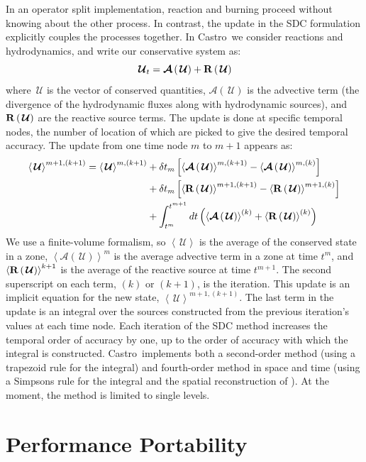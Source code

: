 \documentclass[a4paper]{jpconf}
\newcommand{\castro}{{\sffamily Castro}}
\newcommand{\Uc}{{\,\bm{\mathcal{U}}}}
\newcommand{\Advs}[1]{\boldsymbol{\mathcal{A}} \left(#1\right)}
\newcommand{\avg}[1]{{\left \langle #1 \right \rangle}}
\newcommand{\Rbs}[1]{{\bf R} \left ( #1 \right )}
\begin{document}
In an operator split implementation, reaction and burning proceed
without knowing about the other process.  In contrast, the update in
the SDC formulation explicitly couples the processes together.  In \castro\ we consider
reactions and hydrodynamics, and write our conservative system as:
\begin{equation}
\Uc_t = \Advs{\Uc} + \Rbs{\Uc}
\end{equation}
where $\Uc$ is the vector of conserved quantities, $\Advs{\Uc}$ is the
advective term (the divergence of the hydrodynamic fluxes along with
hydrodynamic sources), and $\Rbs{\Uc}$ are the reactive source terms.
The update is done at specific temporal nodes, the number of location
of which are picked to give the desired temporal accuracy.  The update
from one time node $m$ to $m+1$ appears as:
    \begin{align}
      \label{eq:sdc:general}
      \avg{\Uc}^{{m+1},(k+1)} = \avg{\Uc}^{m,(k+1)}
            &+ \delta t_m \left [ \avg{\Advs{\Uc}}^{m,(k+1)} - \avg{\Advs{\Uc}}^{m,(k)} \right ] \nonumber \\
            &+ \delta t_m \left [ \avg{\Rbs{\Uc}}^{{m+1},(k+1)} - \avg{\Rbs{\Uc}}^{{m+1},(k)} \right ] \nonumber \\
            &+ \int_{t^m}^{t^{m+1}} dt  \left (\avg{\Advs{\Uc}}^{(k)} + \avg{\Rbs{\Uc}}^{(k)}\right)
   \end{align}
We use a finite-volume formalism, so $\avg{\Uc}$ is the average of the
conserved state in a zone, $\avg{\Advs{\Uc}}^m$ is the average
advective term in a zone at time $t^m$, and $\avg{\Rbs{\Uc}}^{k+1}$ is
the average of the reactive source at time $t^{m+1}$.  The second
superscript on each term, $(k)$ or $(k+1)$, is the iteration.  This
update is an implicit equation for the new state,
$\avg{\Uc}^{{m+1},(k+1)}$.  The last term in the update is an integral
over the sources constructed from the previous iteration's values at
each time node.  Each iteration of the SDC method increases the
temporal order of accuracy by one, up to the order of accuracy with
which the integral is constructed.  \castro\ implements both a
second-order method (using a trapezoid rule for the integral) and
fourth-order method in space and time (using a Simpsons rule for the
integral and the spatial reconstruction of
\cite{mccorquodalecolella}).  At the moment, the method is limited to
single levels.


\section{Performance Portability}
\end{document}

